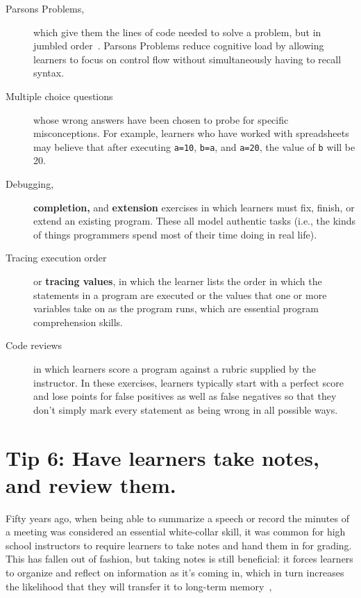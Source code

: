 \documentclass[10pt,letterpaper]{article}
\newcommand{\rulemajor}[1]{\section{#1}}
\begin{document}
\begin{description}

\item[Parsons Problems,]
  which give them the lines of code needed to solve a problem,
  but in jumbled order~\cite{Pars2006,Morr2016,Eric2017}.
  Parsons Problems reduce cognitive load by allowing learners to focus on control flow
  without simultaneously having to recall syntax.

\item[Multiple choice questions]
  whose wrong answers have been chosen to probe for specific misconceptions.
  For example, learners who have worked with spreadsheets may believe that
  after executing \texttt{a=10}, \texttt{b=a}, and \texttt{a=20},
  the value of \texttt{b} will be 20.

\item[Debugging,] \textbf{completion,} and \textbf{extension} exercises
  in which learners must fix, finish, or extend an existing program.
  These all model authentic tasks
  (i.e., the kinds of things programmers spend most of their time doing in real life).

\item[Tracing execution order] or \textbf{tracing values},
  in which the learner lists the order in which the statements in a program are executed
  or the values that one or more variables take on as the program runs,
  which are essential program comprehension skills.

\item[Code reviews]
  in which learners score a program against a rubric supplied by the instructor.
  In these exercises,
  learners typically start with a perfect score and lose points for false positives as well as false negatives
  so that they don't simply mark every statement as being wrong in all possible ways.
  
\end{description}

\rulemajor{Tip 6: Have learners take notes, and review them.}

Fifty years ago,
when being able to summarize a speech or record the minutes of a meeting
was considered an essential white-collar skill,
it was common for high school instructors to require learners to take notes
and hand them in for grading.
This has fallen out of fashion,
but taking notes is still beneficial:
it forces learners to organize and reflect on information as it's coming in,
which in turn increases the likelihood that they will transfer it to long-term memory~\cite{Aike1975,Boha2011},
\end{document}
